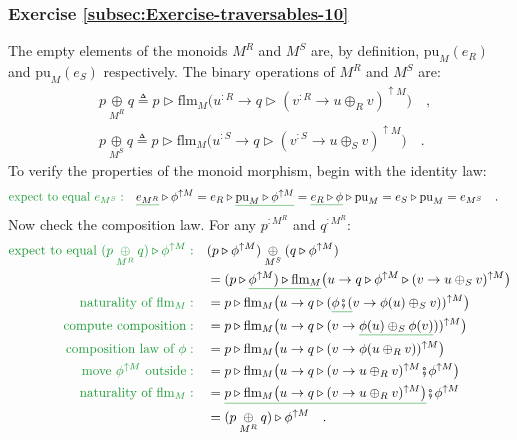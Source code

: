 \subsubsection*{Exercise \ref{subsec:Exercise-traversables-10}}

The empty elements of the monoids $M^{R}$ and $M^{S}$ are, by definition,
$\text{pu}_{M}(e_{R})$ and $\text{pu}_{M}(e_{S})$ respectively.
The binary operations of $M^{R}$ and $M^{S}$ are:
\begin{align*}
 & p\underset{M^{R}}{\oplus}q\triangleq p\triangleright\text{flm}_{M}\big(u^{:R}\rightarrow q\triangleright(v^{:R}\rightarrow u\oplus_{R}v)^{\uparrow M}\big)\quad,\\
 & p\underset{M^{S}}{\oplus}q\triangleq p\triangleright\text{flm}_{M}\big(u^{:S}\rightarrow q\triangleright(v^{:S}\rightarrow u\oplus_{S}v)^{\uparrow M}\big)\quad.
\end{align*}
To verify the properties of the monoid morphism, begin with the identity
law:
\begin{align*}
{\color{greenunder}\text{expect to equal }e_{M^{S}}:}\quad & \gunderline{e_{M^{R}}}\triangleright\phi^{\uparrow M}=e_{R}\triangleright\gunderline{\text{pu}_{M}\triangleright\phi^{\uparrow M}}=\gunderline{e_{R}\triangleright\phi}\triangleright\text{pu}_{M}=e_{S}\triangleright\text{pu}_{M}=e_{M^{S}}\quad.
\end{align*}
Now check the composition law. For any $p^{:M^{R}}$ and $q^{:M^{R}}$:
\begin{align*}
{\color{greenunder}\text{expect to equal }(p\underset{M^{R}}{\oplus}q)\triangleright\phi^{\uparrow M}:}\quad & (p\triangleright\phi^{\uparrow M})\underset{M^{S}}{\oplus}(q\triangleright\phi^{\uparrow M})\\
 & =(p\triangleright\gunderline{\phi^{\uparrow M})\triangleright\text{flm}_{M}}\big(u\rightarrow q\triangleright\phi^{\uparrow M}\triangleright(v\rightarrow u\oplus_{S}v)^{\uparrow M}\big)\\
{\color{greenunder}\text{naturality of }\text{flm}_{M}:}\quad & =p\triangleright\text{flm}_{M}\big(u\rightarrow q\triangleright(\gunderline{\phi\bef(}v\rightarrow\phi(u)\oplus_{S}v))^{\uparrow M}\big)\\
{\color{greenunder}\text{compute composition}:}\quad & =p\triangleright\text{flm}_{M}\big(u\rightarrow q\triangleright(v\rightarrow\gunderline{\phi(u)\oplus_{S}\phi(v)}))^{\uparrow M}\big)\\
{\color{greenunder}\text{composition law of }\phi:}\quad & =p\triangleright\text{flm}_{M}\big(u\rightarrow q\triangleright(v\rightarrow\phi(u\oplus_{R}v))^{\uparrow M}\big)\\
{\color{greenunder}\text{move }\phi^{\uparrow M}\text{ outside}:}\quad & =p\triangleright\text{flm}_{M}\big(u\rightarrow q\triangleright(v\rightarrow u\oplus_{R}v)^{\uparrow M}\bef\phi^{\uparrow M}\big)\\
{\color{greenunder}\text{naturality of }\text{flm}_{M}:}\quad & =\gunderline{p\triangleright\text{flm}_{M}\big(u\rightarrow q\triangleright(v\rightarrow u\oplus_{R}v)^{\uparrow M}\big)}\bef\phi^{\uparrow M}\\
 & =(p\underset{M^{R}}{\oplus}q)\triangleright\phi^{\uparrow M}\quad.
\end{align*}


